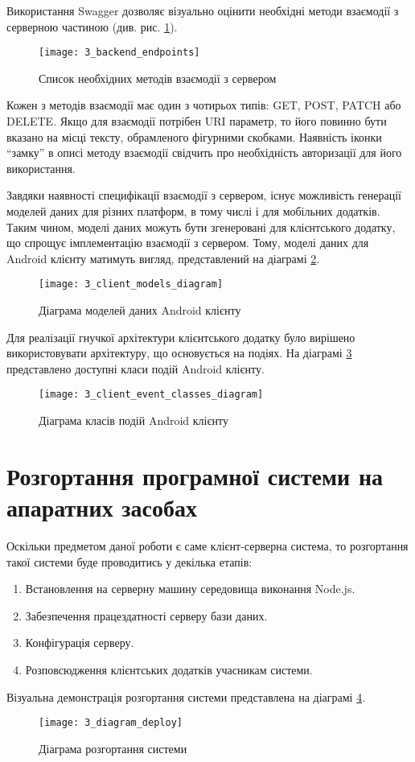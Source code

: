 \documentclass[../main.tex]{subfiles}
\begin{document}
Використання Swagger дозволяє візуально оцінити необхідні методи взаємодії з серверною частиною (див. рис. \ref{available_rest_endpoints}).

\begin{figure}[H]
	\centering
	\texttt{[image: 3\_backend\_endpoints]}
	\caption{Список необхідних методів взаємодії з сервером}
	\label{available_rest_endpoints}
\end{figure}

Кожен з методів взаємодії має один з чотирьох типів: GET, POST, PATCH або DELETE. Якщо для взаємодії потрібен URI параметр, то його повинно бути вказано на місці тексту, обрамленого фігурними скобками. Наявність іконки \enquote{замку} в описі методу взаємодії свідчить про необхідність авторизації для його використання.

Завдяки наявності специфікації взаємодії з сервером, існує можливість генерації моделей даних для різних платформ, в тому числі і для мобільних додатків. Таким чином, моделі даних можуть бути згенеровані для клієнтського додатку, що спрощує імплементацію взаємодії з сервером. Тому, моделі даних для Android клієнту матимуть вигляд, представлений на діаграмі \ref{client_models}.

\begin{figure}[H]
	\centering
	\texttt{[image: 3\_client\_models\_diagram]}
	\caption{Діаграма моделей даних Android клієнту}
	\label{client_models}
\end{figure}

Для реалізації гнучкої архітектури клієнтського додатку було вирішено використовувати архітектуру, що основується на подіях. На діаграмі \ref{client_events} представлено доступні класи подій Android клієнту.

\begin{figure}[H]
	\centering
	\texttt{[image: 3\_client\_event\_classes\_diagram]}
	\caption{Діаграма класів подій Android клієнту}
	\label{client_events}
\end{figure}

\section{Розгортання програмної системи на апаратних засобах}

Оскільки предметом даної роботи є саме клієнт-серверна система, то розгортання такої системи буде проводитись у декілька етапів:
\begin{enumerate}
	\item Встановлення на серверну машину середовища виконання Node.js.
	\item Забезпечення працездатності серверу бази даних.
	\item Конфігурація серверу.
	\item Розповсюдження клієнтських додатків учасникам системи.
\end{enumerate}

Візуальна демонстрація розгортання системи представлена на діаграмі \ref{diagram_deploy}.

\begin{figure}[H]
	\centering
	\texttt{[image: 3\_diagram\_deploy]}
	\caption{Діаграма розгортання системи}
	\label{diagram_deploy}
\end{figure}
\end{document}
